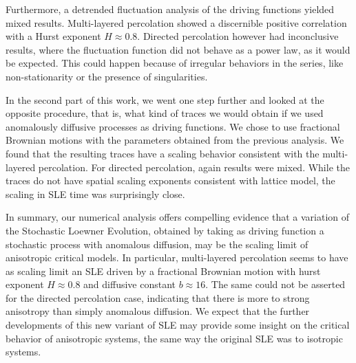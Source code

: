Furthermore, a detrended fluctuation analysis of the driving functions yielded
mixed results. Multi-layered percolation showed a discernible positive
correlation with a Hurst exponent $H\approx0.8$. Directed percolation however
had inconclusive results, where the fluctuation function did not behave as a
power law, as it would be expected. This could happen because of irregular
behaviors in the series, like non-stationarity or the presence of
singularities.

In the second part of this work, we went one step further and looked at the
opposite procedure, that is, what kind of traces we would obtain if we used
anomalously diffusive processes as driving functions. We chose to use
fractional Brownian motions with the parameters obtained from the previous
analysis. We found that the resulting traces have a scaling behavior consistent
with the multi-layered percolation. For directed percolation, again results
were mixed. While the traces do not have spatial scaling exponents consistent
with lattice model, the scaling in SLE time was surprisingly close.

In summary, our numerical analysis offers compelling evidence that a variation
of the Stochastic Loewner Evolution, obtained by taking as driving function a
stochastic process with anomalous diffusion, may be the scaling limit of
anisotropic critical models. In particular, multi-layered percolation seems to
have as scaling limit an SLE driven by a fractional Brownian motion with hurst
exponent $H\approx0.8$ and diffusive constant $b\approx16$. The same could not
be asserted for the directed percolation case, indicating that there is more to
strong anisotropy than simply anomalous diffusion. We expect that the further
developments of this new variant of SLE may provide some insight on the
critical behavior of anisotropic systems, the same way the original SLE was to
isotropic systems.
